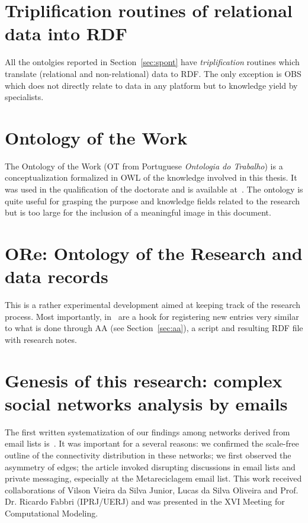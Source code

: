 \begin{apendicesenv}
\section{Triplification routines of relational data into RDF}
All the ontolgies reported in Section~\ref{sec:spont} have \emph{triplification}
routines which translate (relational and non-relational) data to RDF.
The only exception is OBS which does not directly relate to data in any platform
but to knowledge yield by specialists.

\section{Ontology of the Work}
The Ontology of the Work (OT from Portuguese \emph{Ontologia do Trabalho})
is a conceptualization formalized in OWL of the knowledge involved in this thesis.
It was used in the qualification of the doctorate and is available at~\cite{OT}.
The ontology is quite useful for grasping the purpose and knowledge fields related to
the research but is too large for the inclusion of a meaningful image in this document.

\section{ORe: Ontology of the Research and data records}
This is a rather experimental development aimed at keeping track
of the research process.
Most importantly, in~\cite{ore} are a hook for registering new entries
very similar to what is done through AA (see Section~\ref{sec:aa}), a script and resulting RDF file
with research notes.

\section{Genesis of this research: complex social networks analysis by emails}
The first written systematization of our findings among networks derived from email lists
is~\cite{comp1}.
It was important for a several reasons: we confirmed the scale-free outline of the connectivity distribution
in these networks;
we first observed the asymmetry of edges;
the article invoked disrupting discussions in email lists and private messaging, especially at the Metareciclagem email list.
This work received collaborations of Vilson Vieira da Silva Junior, Lucas da Silva Oliveira
and Prof. Dr. Ricardo Fabbri (IPRJ/UERJ)
and was presented in the XVI Meeting for Computational Modeling.


\end{apendicesenv}
